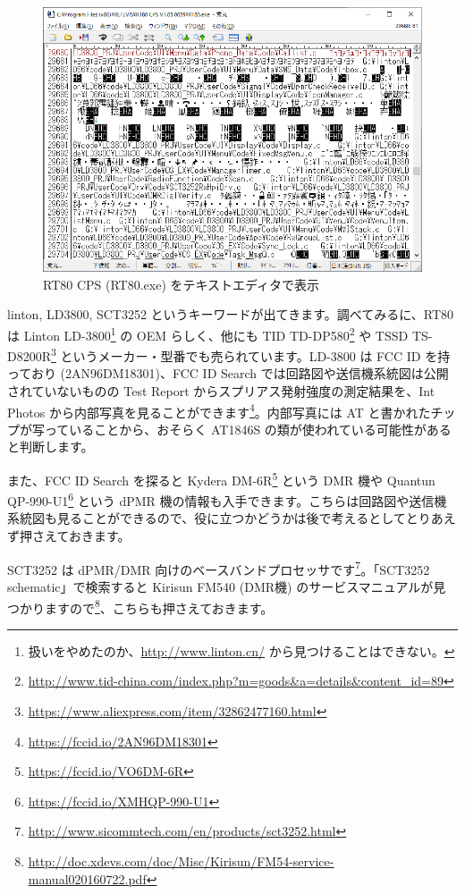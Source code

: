 \documentclass[a4j,oneside]{ujbook}
\begin{document}
\begin{figure}[H]
 \centering
 \includegraphics[width=15cm]{img/rt80-cps.png}
 \caption{RT80 CPS (RT80.exe) をテキストエディタで表示}
\end{figure}

linton, LD3800, SCT3252 というキーワードが出てきます。調べてみるに、RT80 は Linton LD-3800\footnote{扱いをやめたのか、\url{http://www.linton.cn/} から見つけることはできない。} の OEM らしく、他にも TID TD-DP580\footnote{\url{http://www.tid-china.com/index.php?m=goods&a=details&content_id=89}} や TSSD TS-D8200R\footnote{\url{https://www.aliexpress.com/item/32862477160.html}} というメーカー・型番でも売られています。LD-3800 は FCC ID を持っており (2AN96DM18301)、FCC ID Search では回路図や送信機系統図は公開されていないものの Test Report からスプリアス発射強度の測定結果を、Int Photos から内部写真を見ることができます\footnote{\url{https://fccid.io/2AN96DM18301}}。内部写真には AT と書かれたチップが写っていることから、おそらく AT1846S の類が使われている可能性があると判断します。

また、FCC ID Search を探ると Kydera DM-6R\footnote{\url{https://fccid.io/VO6DM-6R}} という DMR 機や Quantun QP-990-U1\footnote{\url{https://fccid.io/XMHQP-990-U1}} という dPMR 機の情報も入手できます。こちらは回路図や送信機系統図も見ることができるので、役に立つかどうかは後で考えるとしてとりあえず押さえておきます。

SCT3252 は dPMR/DMR 向けのベースバンドプロセッサです\footnote{\url{http://www.sicommtech.com/en/products/sct3252.html}}。「SCT3252 schematic」で検索すると Kirisun FM540 (DMR機) のサービスマニュアルが見つかりますので\footnote{\url{http://doc.xdevs.com/doc/Misc/Kirisun/FM54-service-manual020160722.pdf}}、こちらも押さえておきます。
\end{document}
